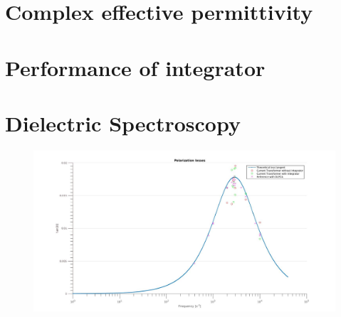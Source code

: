 \section{Complex effective permittivity}
\subsection{}

\section{Performance of integrator}

\section{Dielectric Spectroscopy}

\begin{figure}[htbp]
\centering
\includegraphics[scale=0.3]{figures/Results/Spectroscopy/spectroscopywithoutbars}
\label{fig.spectroscopy}

\end{figure}

